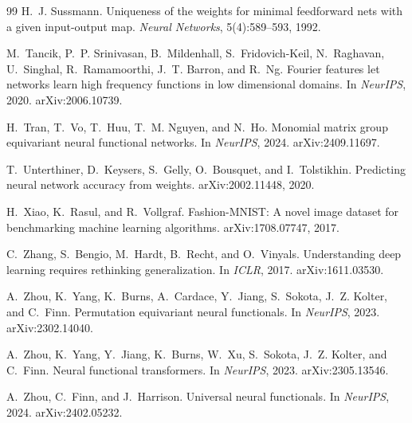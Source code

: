 \begin{thebibliography}{99}
H.~J. Sussmann.
\newblock Uniqueness of the weights for minimal feedforward nets with a given input-output map.
\newblock \emph{Neural Networks}, 5(4):589--593, 1992.

M.~Tancik, P.~P. Srinivasan, B.~Mildenhall, S.~Fridovich-Keil, N.~Raghavan, U.~Singhal,
R.~Ramamoorthi, J.~T. Barron, and R.~Ng.
\newblock Fourier features let networks learn high frequency functions in low dimensional domains.
\newblock In \emph{NeurIPS}, 2020. arXiv:2006.10739.

H.~Tran, T.~Vo, T.~Huu, T.~M. Nguyen, and N.~Ho.
\newblock Monomial matrix group equivariant neural functional networks.
\newblock In \emph{NeurIPS}, 2024. arXiv:2409.11697.

T.~Unterthiner, D.~Keysers, S.~Gelly, O.~Bousquet, and I.~Tolstikhin.
\newblock Predicting neural network accuracy from weights.
\newblock arXiv:2002.11448, 2020.

H.~Xiao, K.~Rasul, and R.~Vollgraf.
\newblock Fashion-MNIST: A novel image dataset for benchmarking machine learning algorithms.
\newblock arXiv:1708.07747, 2017.

C.~Zhang, S.~Bengio, M.~Hardt, B.~Recht, and O.~Vinyals.
\newblock Understanding deep learning requires rethinking generalization.
\newblock In \emph{ICLR}, 2017. arXiv:1611.03530.

A.~Zhou, K.~Yang, K.~Burns, A.~Cardace, Y.~Jiang, S.~Sokota, J.~Z. Kolter, and C.~Finn.
\newblock Permutation equivariant neural functionals.
\newblock In \emph{NeurIPS}, 2023. arXiv:2302.14040.

A.~Zhou, K.~Yang, Y.~Jiang, K.~Burns, W.~Xu, S.~Sokota, J.~Z. Kolter, and C.~Finn.
\newblock Neural functional transformers.
\newblock In \emph{NeurIPS}, 2023. arXiv:2305.13546.

A.~Zhou, C.~Finn, and J.~Harrison.
\newblock Universal neural functionals.
\newblock In \emph{NeurIPS}, 2024. arXiv:2402.05232.

\end{thebibliography}
